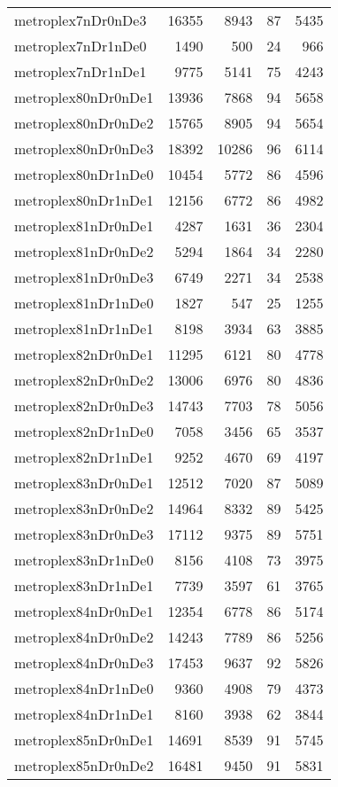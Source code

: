 \begin{longtable}{lrrrr}
metroplex7nDr0nDe3 & 16355 & 8943 & 87 & 5435 \\
metroplex7nDr1nDe0 & 1490 & 500 & 24 & 966 \\
metroplex7nDr1nDe1 & 9775 & 5141 & 75 & 4243 \\
metroplex80nDr0nDe1 & 13936 & 7868 & 94 & 5658 \\
metroplex80nDr0nDe2 & 15765 & 8905 & 94 & 5654 \\
metroplex80nDr0nDe3 & 18392 & 10286 & 96 & 6114 \\
metroplex80nDr1nDe0 & 10454 & 5772 & 86 & 4596 \\
metroplex80nDr1nDe1 & 12156 & 6772 & 86 & 4982 \\
metroplex81nDr0nDe1 & 4287 & 1631 & 36 & 2304 \\
metroplex81nDr0nDe2 & 5294 & 1864 & 34 & 2280 \\
metroplex81nDr0nDe3 & 6749 & 2271 & 34 & 2538 \\
metroplex81nDr1nDe0 & 1827 & 547 & 25 & 1255 \\
metroplex81nDr1nDe1 & 8198 & 3934 & 63 & 3885 \\
metroplex82nDr0nDe1 & 11295 & 6121 & 80 & 4778 \\
metroplex82nDr0nDe2 & 13006 & 6976 & 80 & 4836 \\
metroplex82nDr0nDe3 & 14743 & 7703 & 78 & 5056 \\
metroplex82nDr1nDe0 & 7058 & 3456 & 65 & 3537 \\
metroplex82nDr1nDe1 & 9252 & 4670 & 69 & 4197 \\
metroplex83nDr0nDe1 & 12512 & 7020 & 87 & 5089 \\
metroplex83nDr0nDe2 & 14964 & 8332 & 89 & 5425 \\
metroplex83nDr0nDe3 & 17112 & 9375 & 89 & 5751 \\
metroplex83nDr1nDe0 & 8156 & 4108 & 73 & 3975 \\
metroplex83nDr1nDe1 & 7739 & 3597 & 61 & 3765 \\
metroplex84nDr0nDe1 & 12354 & 6778 & 86 & 5174 \\
metroplex84nDr0nDe2 & 14243 & 7789 & 86 & 5256 \\
metroplex84nDr0nDe3 & 17453 & 9637 & 92 & 5826 \\
metroplex84nDr1nDe0 & 9360 & 4908 & 79 & 4373 \\
metroplex84nDr1nDe1 & 8160 & 3938 & 62 & 3844 \\
metroplex85nDr0nDe1 & 14691 & 8539 & 91 & 5745 \\
metroplex85nDr0nDe2 & 16481 & 9450 & 91 & 5831 \\

\end{longtable}
